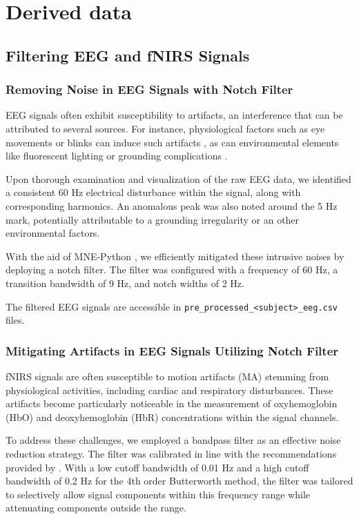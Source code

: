 \section{Derived data}

\subsection{Filtering EEG and fNIRS Signals}

\subsubsection{Removing Noise in EEG Signals with Notch Filter}

EEG signals often exhibit susceptibility to artifacts, an interference that can be attributed to several sources. For instance, physiological factors such as eye movements or blinks can induce such artifacts \cite{10.3389/fnhum.2012.00278}, as can environmental elements like fluorescent lighting or grounding complications \cite{Kaya21}.

Upon thorough examination and visualization of the raw EEG data, we identified a consistent 60 Hz electrical disturbance within the signal, along with corresponding harmonics. An anomalous peak was also noted around the 5 Hz mark, potentially attributable to a grounding irregularity or an other environmental factors.

With the aid of MNE-Python \cite{GramfortEtAl2013a}, we efficiently mitigated these intrusive noises by deploying a notch filter. The filter was configured with a frequency of 60 Hz, a transition bandwidth of 9 Hz, and notch widths of 2 Hz.

The filtered EEG signals are accessible in \texttt{pre\_processed\_<subject>\_eeg.csv} files.

\subsubsection{Mitigating Artifacts in EEG Signals Utilizing Notch Filter}

fNIRS signals are often susceptible to motion artifacts (MA) stemming from physiological activities, including cardiac and respiratory disturbances. These artifacts become particularly noticeable in the measurement of oxyhemoglobin (HbO) and deoxyhemoglobin (HbR) concentrations within the signal channels.

To address these challenges, we employed a bandpass filter as an effective noise reduction strategy. The filter was calibrated in line with the recommendations provided by \cite{Koenraadt2014}. With a low cutoff bandwidth of 0.01 Hz and a high cutoff bandwidth of 0.2 Hz for the 4th order Butterworth method, the filter was tailored to selectively allow signal components within this frequency range while attenuating components outside the range.

